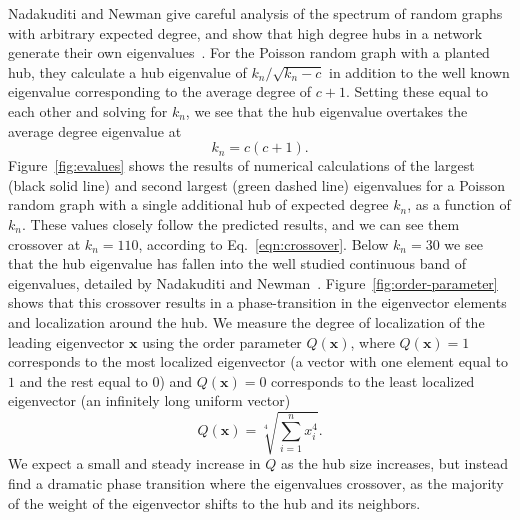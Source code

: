 \documentclass[twocolumn,prl,superscriptaddress]{revtex4}
\renewcommand{\vec}{\mathbf}
\begin{document}
Nadakuditi and Newman give careful analysis of the spectrum of random graphs with arbitrary expected degree, and show that high degree hubs in a network generate their own eigenvalues~\cite{nadakuditi13}. For the Poisson random graph with a planted hub, they calculate a hub eigenvalue of $k_n / \sqrt{k_n - c}$ in addition to the well known eigenvalue corresponding to the average degree of $c+1$. Setting these equal to each other and solving for $k_n$, we see that the hub eigenvalue overtakes the average degree eigenvalue at
\begin{equation}
k_n = c(c+1).
\label{eqn:crossover}
\end{equation}
Figure~\ref{fig:evalues} shows the results of numerical calculations of the largest (black solid line) and second largest (green dashed line) eigenvalues for a Poisson random graph with a single additional hub of expected degree $k_n$, as a function of $k_n$. These values closely follow the predicted results, and we can see them crossover at $k_n = 110$, according to Eq.~\ref{eqn:crossover}. Below $k_n = 30$ we see that the hub eigenvalue has fallen into the well studied continuous band of eigenvalues, detailed by Nadakuditi and Newman~\cite{nadakuditi13}. Figure~\ref{fig:order-parameter} shows that this crossover results in a phase-transition in the eigenvector elements and localization around the hub. We measure the degree of localization of the leading eigenvector $\vec{x}$ using the order parameter $Q(\vec{x})$, where $Q(\vec{x}) = 1$ corresponds to the most localized eigenvector (a vector with one element equal to $1$ and the rest equal to $0$) and $Q(\vec{x}) = 0$ corresponds to the least localized eigenvector (an infinitely long uniform vector)
\[Q(\vec{x}) = \sqrt[4]{\sum_{i=1}^n x_i ^ 4}.\]
We expect a small and steady increase in $Q$ as the hub size increases, but instead find a dramatic phase transition where the eigenvalues crossover, as the majority of the weight of the eigenvector shifts to the hub and its neighbors.
\end{document}
